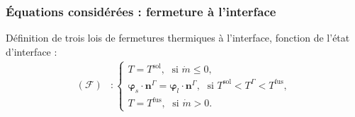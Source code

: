 \documentclass{beamer}
\newcommand{\inte}{\Gamma}
\newcommand{\fus}{\text{fus}}
\newcommand{\sol}{\text{sol}}
\newcommand{\vect}[1]{\bm{#1}}
\newcommand{\norm}{\vect{n}}
\begin{document}
\begin{frame}
    \frametitle{Équations considérées : fermeture à l'interface}
\footnotesize


\begin{center}
		\begin{tikzpicture}[scale = 0.5, every node/.style={scale=0.5}]
			
		\end{tikzpicture}

\end{center}
\begin{ceablock}{Définition de trois lois de fermetures thermiques à l'interface, fonction de l'état d'interface :}
\begin{align}
	(\mathcal{F}) &:\left\{ \begin{array}{l}
T=T^\sol,  \; \text{ si } \Dot{m} \leq 0, \\
\vect{\varphi}_s \cdot \norm^\inte= \vect{\varphi}_l \cdot \norm^\inte,  \; \text{ si } T^\sol < T^\inte < T^\fus,\\
T=T^\fus,   \; \text{ si } \Dot{m}>0.
 \end{array}\right.
\end{align}
\end{ceablock}
\end{frame}
\end{document}
